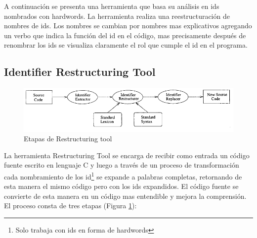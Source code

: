 \documentclass[12pt]{report}
\begin{document}






A continuación se presenta una herramienta que basa su análisis en ids nombrados con hardwords. La herramienta realiza una reestructuración de nombres de ids. Los nombres se cambian por nombres mas explicativos agregando un verbo que indica la función del id en el código, mas precisamente después de renombrar los ids se visualiza claramente el rol que cumple el id en el programa.


\subsection{Identifier Restructuring Tool}

\begin{figure}[h] %
\centering
\includegraphics[scale= 0.80]{./ire_1.png}
\caption{Etapas de Restructuring tool}
\label{ire1}
\end{figure}

La herramienta Restructuring Tool\cite{BCPT00} se encarga de recibir como entrada un código fuente escrito en lenguaje C y luego a través de un proceso de transformación cada nombramiento de los id\footnote[1]{Solo trabaja con ids en forma de hardwords} se expande a palabras completas, retornando de esta manera el mismo código pero con los ids expandidos.
El código fuente se convierte de esta manera en un código mas entendible y mejora la comprensión. El proceso consta de tres etapas (Figura \ref{ire1}): 
\end{document}
